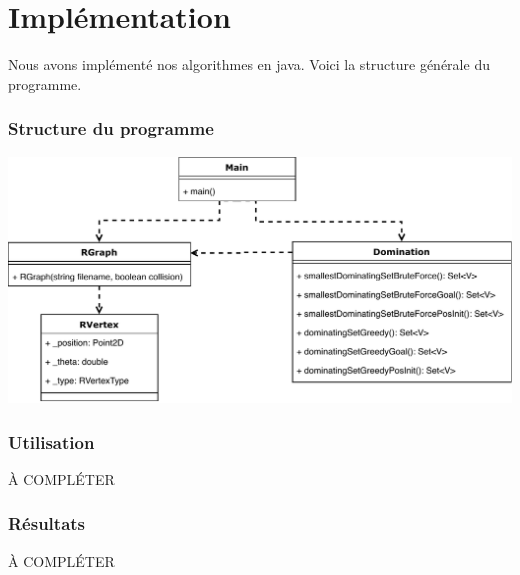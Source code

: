 \part{Implémentation}
Nous avons implémenté nos algorithmes en java. Voici la structure générale du programme.

\section{Structure du programme}
\scalebox{0.89} {
\includegraphics{robotdef.pdf}
} \newline



\section{Utilisation}

À COMPLÉTER

\section{Résultats}

À COMPLÉTER